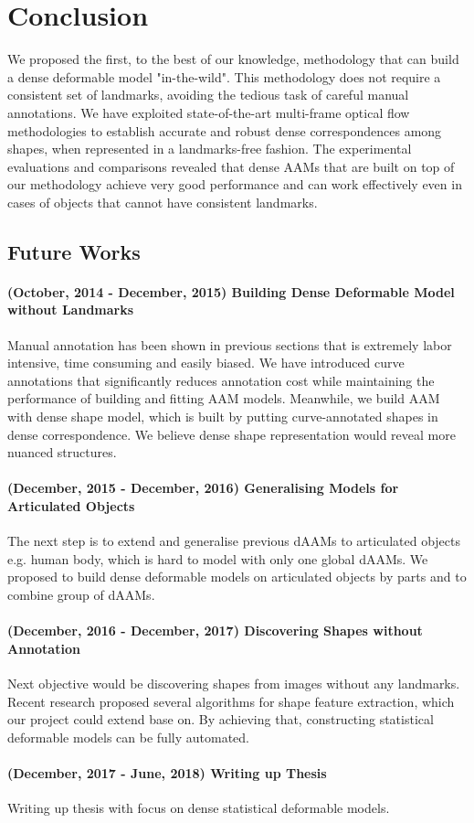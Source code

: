 \chapter{Conclusion}
\label{ch:conclusions}

We proposed the first, to the best of our knowledge, methodology that can build a dense deformable model "in-the-wild". This methodology does not require a consistent set of landmarks, avoiding the tedious task of careful manual annotations. We have exploited state-of-the-art multi-frame optical flow methodologies to establish accurate and robust dense correspondences among shapes, when represented in a landmarks-free fashion. The experimental evaluations and comparisons revealed that dense AAMs that are built on top of our methodology achieve very good performance and can work effectively even in cases of objects that cannot have consistent landmarks.

\section{Future Works}

\subsubsection{(October, 2014 - December, 2015) Building Dense Deformable Model without Landmarks} 
Manual annotation has been shown in previous sections that is extremely labor intensive, time consuming and easily biased. We have introduced curve annotations that significantly reduces annotation cost while maintaining the performance of building and fitting AAM models. Meanwhile, we build AAM with dense shape model, which is built by putting curve-annotated shapes in dense correspondence. We believe dense shape representation would reveal more nuanced structures.

\subsubsection{(December, 2015 - December, 2016) Generalising Models for Articulated Objects}
The next step is to extend and generalise previous dAAMs to articulated objects e.g. human body, which is hard to model with only one global dAAMs. We proposed to build dense deformable models on articulated objects by parts and to combine group of dAAMs.

\subsubsection{(December, 2016 - December, 2017) Discovering Shapes without Annotation}
Next objective would be discovering shapes from images without any landmarks. Recent research \cite{zhou2015flowweb, jia2014roml, jiang2009learning} proposed several algorithms for shape feature extraction, which our project could extend base on. By achieving that, constructing statistical deformable models can be fully automated.

\subsubsection{(December, 2017 - June, 2018) Writing up Thesis}
Writing up thesis with focus on dense statistical deformable models.